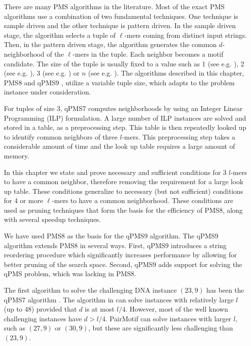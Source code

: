 There are many PMS algorithms in the literature. Most of the exact PMS
 algorithms use a combination of two fundamental techniques. One technique is sample driven and the other
technique is pattern driven. In the sample driven stage, the algorithm selects
a tuple of $\ell$-mers coming from distinct input strings.  Then, in the pattern driven stage,
the algorithm generates the common $d$-neighborhood of the $\ell$-mers in the tuple.
Each neighbor becomes a motif candidate. The size of the tuple
is usually fixed to a value such as 1 (see e.g. \cite{RBH05,DBR07,RD11}), 2 (see
e.g.
\cite{YHZG12}), 3 (see e.g. \cite{T14,DRK11,BSR12,DRD12}) or $n$ (see e.g.
\cite{Pev00,IA14}). The algorithms described in this chapter, PMS8
\cite{NRPMS14} and qPMS9 \cite{NRPMS15}, utilize a variable tuple size, which
adapts to the problem instance under consideration. 


For tuples of size 3, qPMS7 \cite{DRD12} computes neighborhoods by using an
Integer Linear Programming (ILP) formulation. A large number of ILP
instances are solved and stored in a table, as a preprocessing step.
This table is then repeatedly looked up to identify common neighbors of three $l$-mers. This preprocessing step takes a considerable amount of time
and the look up table requires a large amount of memory. 

In this chapter
we state and prove necessary and sufficient conditions for $3$ $l$-mers to have a
common neighbor, therefore removing the requirement for a large look up table.
These conditions generalize to necessary (but not sufficient) conditions for $4$
or more $\ell$-mers to have a common neighborhood. These conditions are
used as pruning techniques that form the basis for the efficiency of PMS8,
along with several speedup techniques. 

We have used PMS8 as the basis for the
qPMS9 algorithm. The qPMS9 algorithm extends PMS8 in several ways. First, qPMS9
introduces a string reordering procedure which significantly increases
performance by allowing for better pruning of the search space. Second, qPMS9 adds support for
solving the qPMS problem, which was lacking in PMS8.


The first algorithm to solve the challenging DNA instance  $(23,9)$ has
been the qPMS7 algorithm \cite{DRD12}. The algorithm in \cite{DeM11}
can solve instances with relatively large $l$ (up to $48$) provided that $d$ is at most $l/4$. However, most of the well known
challenging instances have $d>l/4$. PairMotif \cite{YHZG12} can solve instances
with larger $l$, such as $(27,9)$ or $(30,9)$, but these are significantly less
challenging than $(23,9)$.

